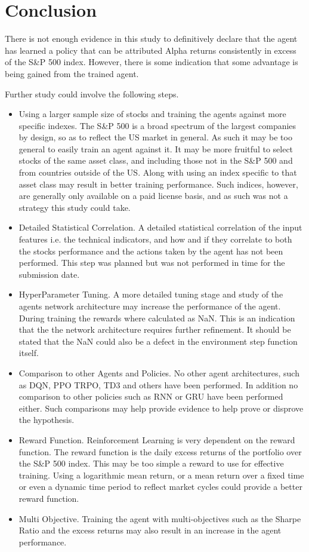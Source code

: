 \documentclass[oneside,12pt]{Classes/RoboticsLaTeX}
\begin{document}
\chapter{Conclusion}
\label{chap:conclusion}

There is not enough evidence in this study to definitively declare that the agent has learned a policy that can be attributed Alpha returns consistently in excess of the S\&P 500 index.  However, there is some indication that some advantage is being gained from the trained agent.

Further study could involve the following steps.
\begin{itemize}
    \item Using a larger sample size of stocks and training the agents against more specific indexes. The S\&P 500 is a broad spectrum of the largest companies by design, so as to reflect the US market in general.  As such it may be too general to easily train an agent against it. It may be more fruitful to select stocks of the same asset class, and including those not in the S\&P 500 and from countries outside of the US. Along with using an index specific to  that asset class may result in better training performance. Such indices, however, are generally only available on a paid license basis, and as such was not a strategy this study could take.
    \item Detailed Statistical Correlation.  A detailed statistical correlation of the input features i.e. the technical indicators, and how and if they correlate to both the stocks performance and the actions taken by the agent has not been  performed. This step was planned but was not performed in time for the submission date.
    \item HyperParameter Tuning. A more detailed tuning stage and study of the agents network architecture may increase the performance of the agent. During training the rewards where calculated as NaN. This is an indication that the  the network architecture requires further refinement. It should be stated that the NaN could also be a defect in the environment step function itself.
    \item Comparison to other Agents and Policies.  No other agent architectures, such as DQN, PPO TRPO, TD3 and others have been performed. In addition no comparison to other policies such as RNN or GRU have been performed either.  Such comparisons may help provide evidence to help prove or disprove the hypothesis.
    \item Reward Function. Reinforcement Learning is very dependent on the reward function.  The reward function is the daily excess returns of the portfolio over the S\&P 500 index. This may be too simple a reward to use for effective training. Using a logarithmic mean return, or a mean return over a fixed time or even a dynamic time period to reflect market cycles could provide a better reward function.
    \item Multi Objective. Training the agent with multi-objectives such as the Sharpe Ratio and the excess returns may also result in an increase in the agent performance.
\end{itemize}
\end{document}
